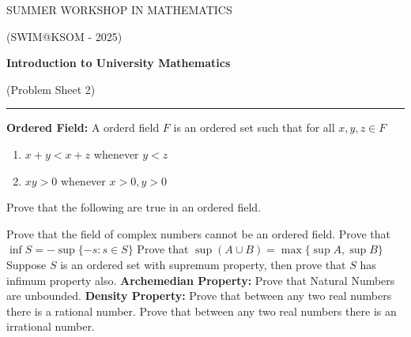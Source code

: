 \documentclass[fleqn]{exam}
\begin{document}
\begin{center}
	{\huge SUMMER WORKSHOP IN MATHEMATICS}
	
	\bigskip
	
	{\large (SWIM@KSOM - 2025)}
	
	\bigskip


	\textbf{\Large Introduction to University Mathematics}
	
	\medskip

	{\large (Problem Sheet 2)}

	\medskip
	
	\hrule
\end{center}


\begin{questions}
	\question \textbf{Ordered Field:} A orderd field $F$ is an ordered set such that for all $x,y,z\in F$
	\begin{enumerate}
		\item $x+y<x+z$ whenever $y<z$
		\item $xy>0$ whenever $x>0,y>0$
	\end{enumerate}
	Prove that the following are true in an ordered field.
	\question Prove that the field of complex numbers cannot be an ordered field.
	\question Prove that $\inf S=-\sup\{-s:s\in S\}$
	\question Prove that $\sup(A\cup B)=\max\{\sup A,\sup B\}$
	\question Suppose $S$ is an ordered set with supremum property, then prove that $S$ has infimum property also.
	\question \textbf{Archemedian Property:} Prove that Natural Numbers are unbounded.
	\question \textbf{Density Property: }Prove that between any two real numbers there is a rational number.
	\question Prove that between any two real numbers there is an irrational number.
\end{questions}
\end{document}
